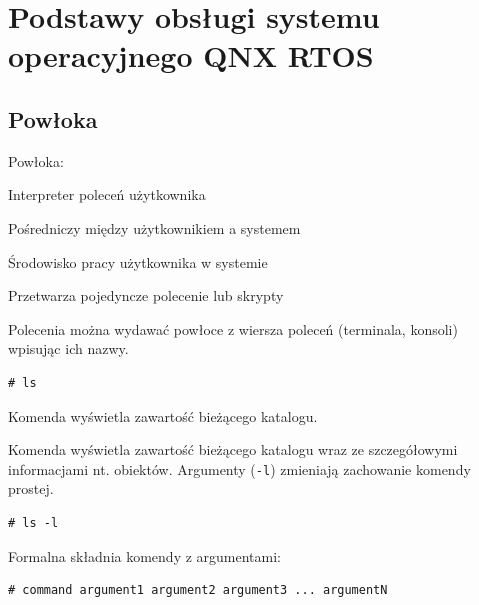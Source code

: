 \section{Podstawy obsługi systemu operacyjnego QNX RTOS}

\subsection{Powłoka}

Powłoka:

\begin{myitemize}
\item Interpreter poleceń użytkownika
\item Pośredniczy między użytkownikiem a systemem
\item Środowisko pracy użytkownika w systemie
\item Przetwarza pojedyncze polecenie lub skrypty
\end{myitemize}


\begin{example} \label{ex:prostakomenda}

Polecenia można wydawać powłoce z wiersza poleceń (terminala, konsoli) wpisując ich nazwy.

\begin{lstlisting}[style=MyBashStyle]
# ls
\end{lstlisting}

Komenda wyświetla zawartość bieżącego katalogu.
\end{example}

\begin{example}\label{ex:prostakomenda2}

Komenda wyświetla zawartość bieżącego katalogu wraz ze szczegółowymi informacjami nt. obiektów. Argumenty (\lstinline[style=MyBashStyle]{-l}) zmieniają zachowanie komendy prostej.

\begin{lstlisting}[style=MyBashStyle]
# ls -l
\end{lstlisting}


Formalna składnia komendy z argumentami:

\begin{lstlisting}[style=MyBashStyle]
# command argument1 argument2 argument3 ... argumentN
\end{lstlisting}
\end{example}

